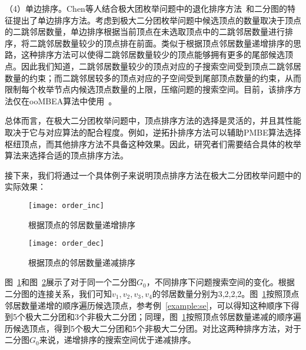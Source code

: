 （4）单边排序。Chen等人结合极大团枚举问题中的退化排序方法~\cite{MCEdegeneracy10}和二分图的特征提出了单边排序方法。考虑到极大二分团枚举问题中候选顶点的数量取决于顶点的二跳邻居数量，单边排序根据当前顶点在未选取顶点中的二跳邻居数量进行排序，将二跳邻居数量较少的顶点排在前面。类似于根据顶点邻居数量递增排序的思路，这种排序方法可以使得二跳邻居数量较少的顶点能够拥有更多的尾部候选顶点。因此我们知道，二跳邻居数量较少的顶点对应的子搜索空间受到顶点二跳邻居数量的约束；而二跳邻居较多的顶点对应的子空间受到尾部顶点数量的约束，从而限制每个枚举节点内候选顶点数量的上限，压缩问题的搜索空间。目前，该排序方法仅在ooMBEA算法中使用~\cite{ooMBE22}。


总体而言，在极大二分团枚举问题中，顶点排序方法的选择是灵活的，并且其性能取决于它与对应算法的配合程度。例如，逆拓扑排序方法可以辅助PMBE算法选择枢纽顶点，而其他排序方法不具备这种效果。因此，研究者们需要结合具体的枚举算法来选择合适的顶点排序方法。


接下来，我们将通过一个具体例子来说明顶点排序方法在极大二分团枚举问题中的实际效果：

\begin{figure} [H]
  \center
		\texttt{[image: order\_inc]}
	\caption{根据顶点的邻居数量递增排序}
	\label{fig:order_inc}
\end{figure}


\begin{figure} [H]
  \center
  \vspace{0.1in}
    \texttt{[image: order\_dec]}
    \vspace{0.05in}
  \caption{根据顶点的邻居数量递减排序}
	\label{fig:order_dec}
\end{figure}

\begin{example}
  图~\ref{fig:order_inc}和图~\ref{fig:order_dec}展示了对于同一个二分图$G_0$，不同排序下问题搜索空间的变化。根据二分图的连接关系，我们可知$v_1,v_2,v_3,v_4$的邻居数量分别为3,2,2,2。图~\ref{fig:order_inc}按照顶点邻居数量递增的顺序遍历候选顶点，参考例~\ref{example:se}，可以得知这种顺序下得到5个极大二分团和3个非极大二分团；同理，图~\ref{fig:order_inc}按照顶点邻居数量递减的顺序遍历候选顶点，得到5个极大二分团和5个非极大二分团。对比这两种排序方法，对于二分图$G_0$来说，递增排序的搜索空间优于递减排序。
\end{example}




